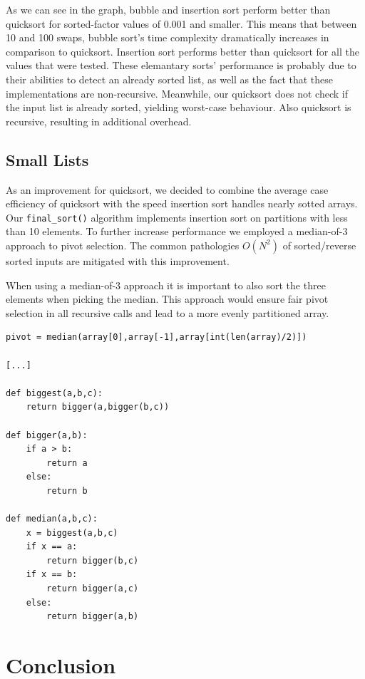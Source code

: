 \documentclass[12pt]{article}
\begin{document}
\noindent As we can see in the graph, bubble and insertion sort perform better than quicksort for sorted-factor values of 0.001 and smaller. This means that between 10 and 100 swaps, bubble sort's time complexity dramatically increases in comparison to quicksort. Insertion sort performs better than quicksort for all the values that were tested. These elemantary sorts' performance is probably due to their abilities to detect an already sorted list, as well as the fact that these implementations are non-recursive. Meanwhile, our quicksort does not check if the input list is already sorted, yielding worst-case behaviour. Also quicksort is recursive, resulting in additional overhead.



\subsection{Small Lists}

As an improvement for quicksort, we decided to combine the average case efficiency of quicksort with the speed insertion sort handles nearly sotted arrays. Our \verb+final_sort()+ algorithm implements insertion sort on partitions with less than 10 elements. To further increase performance we employed a median-of-3 approach to pivot selection. The common pathologies $O(N^2)$ of sorted/reverse sorted inputs are mitigated with this improvement. 

When using a median-of-3 approach it is important to also sort the three elements when picking the median. This approach would ensure fair pivot selection in all recursive calls and lead to a more evenly partitioned array.

\footnotesize
\begin{verbatim}
pivot = median(array[0],array[-1],array[int(len(array)/2)])

[...]

def biggest(a,b,c):
    return bigger(a,bigger(b,c))

def bigger(a,b):
    if a > b:
        return a
    else:
        return b

def median(a,b,c):
    x = biggest(a,b,c)
    if x == a:
        return bigger(b,c)
    if x == b:
        return bigger(a,c)
    else:
        return bigger(a,b)
\end{verbatim}
\normalsize


\section{Conclusion}
\end{document}
